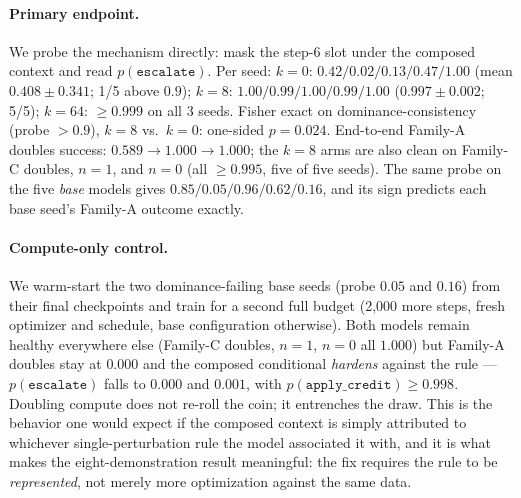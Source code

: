 \documentclass{article}
\begin{document}
\paragraph{Primary endpoint.} We probe the mechanism directly: mask the step-6 slot under the
composed context and read $p(\texttt{escalate})$. Per seed: $k{=}0$:
$0.42/0.02/0.13/0.47/1.00$ (mean $0.408 \pm 0.341$; 1/5 above $0.9$); $k{=}8$:
$1.00/0.99/1.00/0.99/1.00$ ($0.997 \pm 0.002$; 5/5); $k{=}64$: $\ge 0.999$ on all 3 seeds. Fisher
exact on dominance-consistency (probe $> 0.9$), $k{=}8$ vs.\ $k{=}0$: one-sided $p = 0.024$.
End-to-end Family-A doubles success: $0.589 \to 1.000 \to 1.000$; the $k{=}8$ arms are also clean
on Family-C doubles, $n{=}1$, and $n{=}0$ (all $\ge 0.995$, five of five seeds). The same probe on
the five \emph{base} models gives $0.85/0.05/0.96/0.62/0.16$, and its sign predicts each base
seed's Family-A outcome exactly.

\paragraph{Compute-only control.} We warm-start the two dominance-failing base seeds (probe
$0.05$ and $0.16$) from their final checkpoints and train for a second full budget (2{,}000 more
steps, fresh optimizer and schedule, base configuration otherwise). Both models remain healthy
everywhere else (Family-C doubles, $n{=}1$, $n{=}0$ all $1.000$) but Family-A doubles stay at
$0.000$ and the composed conditional \emph{hardens} against the rule --- $p(\texttt{escalate})$
falls to $0.000$ and $0.001$, with $p(\texttt{apply\_credit}) \ge 0.998$. Doubling compute does
not re-roll the coin; it entrenches the draw. This is the behavior one would expect if the composed
context is simply attributed to whichever single-perturbation rule the model associated it with,
and it is what makes the eight-demonstration result meaningful: the fix requires the rule to be
\emph{represented}, not merely more optimization against the same data.
\end{document}
